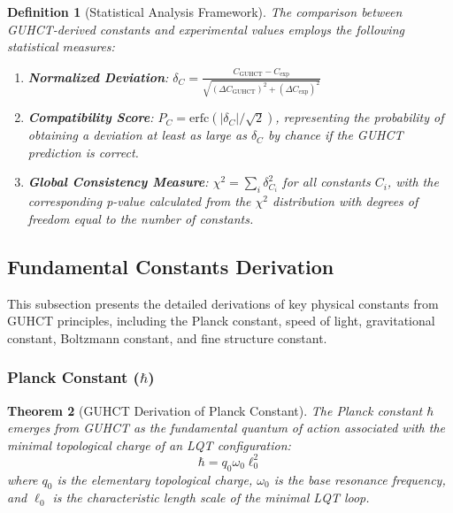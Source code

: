 \documentclass[11pt,a4paper]{article}
\newtheorem{theorem}{Theorem}[section]
\newtheorem{definition}[theorem]{Definition}
\begin{document}
\begin{definition}[Statistical Analysis Framework]
\label{def:statistical_framework}
The comparison between GUHCT-derived constants and experimental values employs the following statistical measures:
\begin{enumerate}
    \item \textbf{Normalized Deviation}: $\delta_C = \frac{C_{\text{GUHCT}} - C_{\text{exp}}}{\sqrt{(\Delta C_{\text{GUHCT}})^2 + (\Delta C_{\text{exp}})^2}}$
    
    \item \textbf{Compatibility Score}: $P_C = \text{erfc}(|\delta_C|/\sqrt{2})$, representing the probability of obtaining a deviation at least as large as $\delta_C$ by chance if the GUHCT prediction is correct.
    
    \item \textbf{Global Consistency Measure}: $\chi^2 = \sum_i \delta_{C_i}^2$ for all constants $C_i$, with the corresponding p-value calculated from the $\chi^2$ distribution with degrees of freedom equal to the number of constants.
\end{enumerate}
\end{definition}

\subsection{Fundamental Constants Derivation}
\label{subsec:fundamental_constants}

This subsection presents the detailed derivations of key physical constants from GUHCT principles, including the Planck constant, speed of light, gravitational constant, Boltzmann constant, and fine structure constant.

\subsubsection{Planck Constant ($\hbar$)}
\label{ssubsec:planck_constant}

\begin{theorem}[GUHCT Derivation of Planck Constant]
\label{thm:planck_constant}
The Planck constant $\hbar$ emerges from GUHCT as the fundamental quantum of action associated with the minimal topological charge of an LQT configuration:
\begin{equation}
\hbar = q_0 \omega_0 \ell_0^2
\label{eq:hbar_def} %
\end{equation}
where $q_0$ is the elementary topological charge, $\omega_0$ is the base resonance frequency, and $\ell_0$ is the characteristic length scale of the minimal LQT loop.
\end{theorem}
\end{document}
